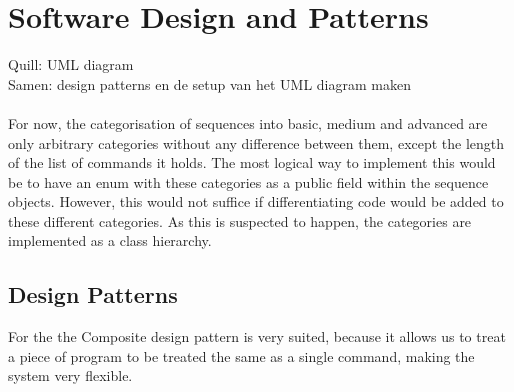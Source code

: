 \chapter{Software Design and Patterns}
Quill: UML diagram\\


Samen: design patterns en de setup van het UML diagram maken\\~\\

For now, the categorisation of sequences into basic, medium and advanced are only arbitrary categories without any difference between them, except the length of the list of commands it holds. The most logical way to implement this would be to have an enum with these categories as a public field within the sequence objects. However, this would not suffice if differentiating code would be added to these different categories. As this is suspected to happen, the categories are implemented as a class hierarchy. 

\section{Design Patterns}
For the  the Composite design pattern is very suited, because it allows us to treat a piece of program to be treated the same as a single command, making the system very flexible. 
